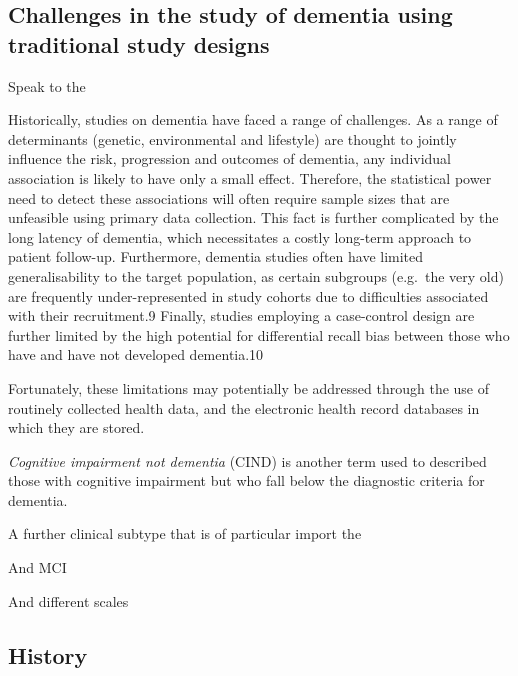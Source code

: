 \documentclass[a4paper, twoside]{templates/ociamthesis}
\begin{document}
\hypertarget{challenges-in-the-study-of-dementia-using-traditional-study-designs}{%
\subsection{Challenges in the study of dementia using traditional study designs}\label{challenges-in-the-study-of-dementia-using-traditional-study-designs}}

Speak to the

Historically, studies on dementia have faced a range of challenges. As a range of determinants (genetic, environmental and lifestyle) are thought to jointly influence the risk, progression and outcomes of dementia, any individual association is likely to have only a small effect. Therefore, the statistical power need to detect these associations will often require sample sizes that are unfeasible using primary data collection. This fact is further complicated by the long latency of dementia, which necessitates a costly long-term approach to patient follow-up. Furthermore, dementia studies often have limited generalisability to the target population, as certain subgroups (e.g.~the very old) are frequently under-represented in study cohorts due to difficulties associated with their recruitment.9 Finally, studies employing a case-control design are further limited by the high potential for differential recall bias between those who have and have not developed dementia.10

Fortunately, these limitations may potentially be addressed through the use of routinely collected health data, and the electronic health record databases in which they are stored.

\emph{Cognitive impairment not dementia} (CIND) is another term used to described those with cognitive impairment but who fall below the diagnostic criteria for dementia.

A further clinical subtype that is of particular import the

And MCI

And different scales

\hypertarget{history}{%
\subsection{History}\label{history}}
\end{document}
